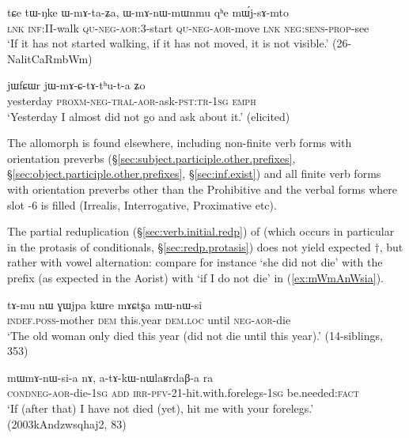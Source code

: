 \begin{exe}
	\ex \label{ex:WmAtaZa}
	\gll tɕe tɯ-ŋke ɯ-mɤ-ta-ʑa, ɯ-mɤ-nɯ-mɯnmu qʰe mɯ́j-sɤ-mto \\
	\textsc{lnk} \textsc{inf}:II-walk \textsc{qu}-\textsc{neg}-\textsc{aor}:3\flobv{}-start \textsc{qu}-\textsc{neg}-\textsc{aor}-move \textsc{lnk} \textsc{neg}:\textsc{sens}-\textsc{prop}-see \\
	\glt `If it has not started walking, if it has not moved, it is not visible.' (26-NalitCaRmbWm)
\end{exe}

\begin{exe}
	\ex \label{ex:jWmACtAthuta}
	\gll  jɯfɕɯr jɯ-mɤ-ɕ-tɤ-tʰu-t-a ʑo \\
	yesterday \textsc{proxm}-\textsc{neg}-\textsc{tral}-\textsc{aor}-ask-\textsc{pst}:\textsc{tr}-\textsc{1sg} \textsc{emph} \\
	\glt `Yesterday I almost did not go and ask about it.' (elicited)
\end{exe}

The allomorph  is found elsewhere, including non-finite verb forms with orientation preverbs (§\ref{sec:subject.participle.other.prefixes}, §\ref{sec:object.participle.other.prefixes}, §\ref{sec:inf.exist}) and all finite verb forms with orientation preverbs other than the Prohibitive and the verbal forms where slot -6 is filled (Irrealis, Interrogative, Proximative etc).

The partial reduplication (§\ref{sec:verb.initial.redp}) of  (which occurs in particular in the protasis of conditionals, §\ref{sec:redp.protasis}) does not yield expected $\dagger$, but rather  with vowel alternation: compare for instance  `she did not die' with the  prefix (as expected in the Aorist) with  `if I do not die' in (\ref{ex:mWmAnWsia}). 


\begin{exe}
	\ex \label{ex:mWnWsi}
	\gll  tɤ-mu nɯ ɣɯjpa kɯre mɤɕtʂa mɯ-nɯ-si \\
	\textsc{indef}.\textsc{poss}-mother \textsc{dem} this.year \textsc{dem}.\textsc{loc} until \textsc{neg}-\textsc{aor}-die \\
	\glt `The old woman only died this year (did not die until this year).' (14-siblings, 353)
\end{exe}

\begin{exe}
	\ex \label{ex:mWmAnWsia}
	\gll mɯ\redp{}mɤ-nɯ-si-a nɤ, a-tɤ-kɯ-nɯlaʁrdaβ-a ra \\
	\textsc{cond}\redp{}\textsc{neg}-\textsc{aor}-die-\textsc{1sg} \textsc{add} \textsc{irr}-\textsc{pfv}-2\fl{}1-hit.with.forelegs-\textsc{1sg} be.needed:\textsc{fact} \\
	\glt `If (after that) I have not died (yet), hit me with your forelegs.' (2003kAndzwsqhaj2, 83)
\end{exe}

